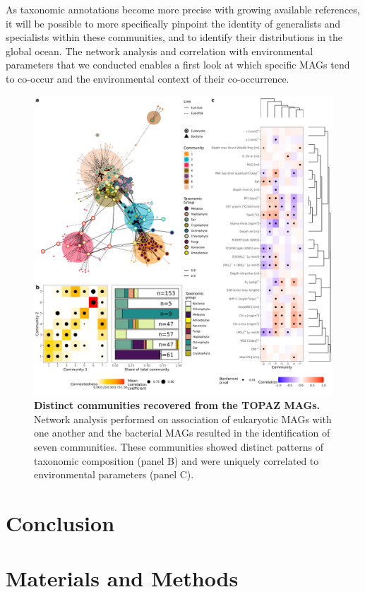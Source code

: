 \documentclass[12pt]{article}
\numberwithin{equation}{section}
\begin{document}
As taxonomic annotations become more precise with growing available references, it will be possible to more specifically pinpoint the identity of generalists and specialists within these communities, and to identify their distributions in the global ocean. The network analysis and correlation with environmental parameters that we conducted enables a first look at which specific MAGs tend to co-occur and the environmental context of their co-occurrence.

\begin{figure}[h!]    %
    \centering
    \includegraphics[width = \columnwidth]{figures/Figure6_Networks.png}
    \caption{ \textbf{Distinct communities recovered from the TOPAZ MAGs.} Network analysis performed on association of eukaryotic MAGs with one another and the bacterial MAGs resulted in the identification of seven communities. These communities showed distinct patterns of taxonomic composition (panel B) and were uniquely correlated to environmental parameters (panel C).}
    \label{fig:fig6-network}
\end{figure}


\section*{Conclusion}
\section*{Materials and Methods}
\end{document}
